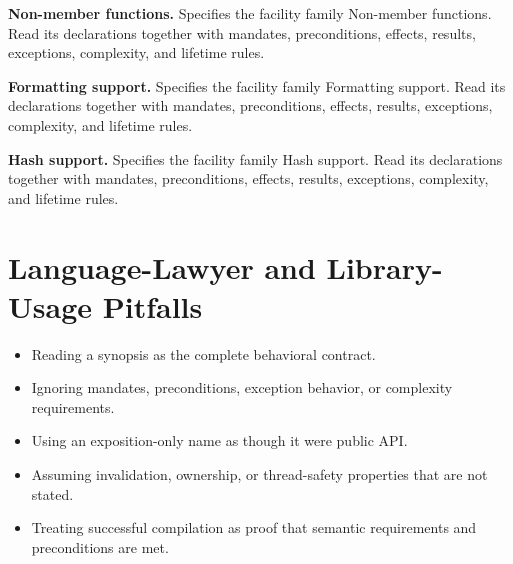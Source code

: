 \documentclass[11pt,letterpaper]{article}
\begin{document}
\begin{description}[style=nextline,leftmargin=2.8cm,font=\normalfont\bfseries\color{CornellReferenceTeal}]
\item[19.6.4.6] \textbf{Non-member functions.} Specifies the facility family Non-member functions. Read its declarations together with mandates, preconditions, effects, results, exceptions, complexity, and lifetime rules.
\item[19.6.4.7] \textbf{Formatting support.} Specifies the facility family Formatting support. Read its declarations together with mandates, preconditions, effects, results, exceptions, complexity, and lifetime rules.
\item[19.6.4.8] \textbf{Hash support.} Specifies the facility family Hash support. Read its declarations together with mandates, preconditions, effects, results, exceptions, complexity, and lifetime rules.
\end{description}
\section{Language-Lawyer and Library-Usage Pitfalls}
\begin{CornellReferencePitfallBox}\begin{itemize}[label=\textcolor{CornellReferenceAmber}{$\blacktriangleright$}]
\item Reading a synopsis as the complete behavioral contract.
\item Ignoring mandates, preconditions, exception behavior, or complexity requirements.
\item Using an exposition-only name as though it were public API.
\item Assuming invalidation, ownership, or thread-safety properties that are not stated.
\item Treating successful compilation as proof that semantic requirements and preconditions are met.
\end{itemize}\end{CornellReferencePitfallBox}
\end{document}
